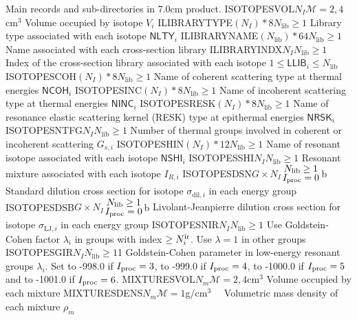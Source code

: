 \begin{DescriptionEnregistrement}{Main records and sub-directories in }{7.0cm}
{  product.}
\OptRealEnr
  {ISOTOPESVOL}{$N_{I}$}{$\mathcal{M}=2, 4$}{cm$^{3}$}
  {Volume occupied by isotope $V_{i}$}
\OptCharEnr
  {ILIBRARYTYPE}{$(N_{I})*8$}{$N_{\mathrm{lib}}\ge 1$}
  {Library type associated with each isotope $\mathsf{NLTY}_{i}$}
\OptCharEnr
  {ILIBRARYNAME}{$(N_{\mathrm{lib}})*64$}{$N_{\mathrm{lib}}\ge 1$}
  {Name associated with each cross-section library}
\OptIntEnr
  {ILIBRARYINDX}{$N_{I}$}{$N_{\mathrm{lib}}\ge 1$}
  {Index of the cross-section library associated with each isotope $1 \le \mathsf{LLIB}_{i}\le N_{\mathrm{lib}}$}
\OptCharEnr
  {ISOTOPESCOH}{$(N_{I})*8$}{$N_{\mathrm{lib}}\ge 1$}
  {Name of coherent scattering type at thermal energies $\mathsf{NCOH}_{i}$}
\OptCharEnr
  {ISOTOPESINC}{$(N_{I})*8$}{$N_{\mathrm{lib}}\ge 1$}
  {Name of incoherent scattering type at thermal energies $\mathsf{NINC}_{i}$}
\OptCharEnr
  {ISOTOPESRESK}{$(N_{I})*8$}{$N_{\mathrm{lib}}\ge 1$}
  {Name of resonance elastic scattering kernel (RESK) type at epithermal energies $\mathsf{NRSK}_{i}$}
\OptIntEnr
  {ISOTOPESNTFG}{$N_{I}$}{$N_{\mathrm{lib}}\ge 1$}
  {Number of thermal groups involved in coherent or incoherent scattering $G_{s,i}$}
\OptCharEnr
  {ISOTOPESHIN}{$(N_{I})*12$}{$N_{\mathrm{lib}}\ge 1$}
  {Name of resonant isotope associated with each isotope $\mathsf{NSHI}_{i}$}
\OptIntEnr
  {ISOTOPESSHI}{$N_{I}$}{$N_{\mathrm{lib}}\ge 1$}
  {Resonant mixture associated with each isotope $I_{R,i}$}
\OptRealEnr
  {ISOTOPESDSN}{$G \times N_{I}$}{${\displaystyle N_{\mathrm{lib}}\ge 1 \atop
  \displaystyle I_{\rm proc}=0}$}{b}
  {Standard dilution cross section for isotope $\sigma_{\mathrm{dil},i}$ in each energy group}
\OptRealEnr
  {ISOTOPESDSB}{$G \times N_{I}$}{${\displaystyle N_{\mathrm{lib}}\ge 1 \atop
  \displaystyle I_{\rm proc}=0}$}{b}
  {Livolant-Jeanpierre dilution cross section for isotope $\sigma_{\mathrm{LJ},i}$ in each energy group}
\OptIntEnr
  {ISOTOPESNIR}{$N_{I}$}{$N_{\mathrm{lib}}\ge 1$}
  {Use Goldstein-Cohen factor $\lambda_i$ in groups with index $\ge N^{\rm ir}_i$.
  Use $\lambda=1$ in other groups}
\OptRealEnr
  {ISOTOPESGIR}{$N_{I}$}{$N_{\mathrm{lib}}\ge 1$}{1}
  {Goldstein-Cohen parameter in low-energy resonant groups $\lambda_i$. Set to -998.0 if
  $I_{\rm proc}=3$, to -999.0 if $I_{\rm proc}=4$, to -1000.0 if $I_{\rm proc}=5$ and to -1001.0 if $I_{\rm proc}=6$.}
\OptRealEnr
  {MIXTURESVOL}{$N_{m}$}{$\mathcal{M}=2, 4$}{cm$^{3}$}
  {Volume occupied by each mixture}
\OptRealEnr
  {MIXTURESDENS}{$N_{m}$}{$\mathcal{M}=1$}{g/cm$^{3}$~~}
  {Volumetric mass density of each mixture $\rho_{m}$}

\end{DescriptionEnregistrement}
